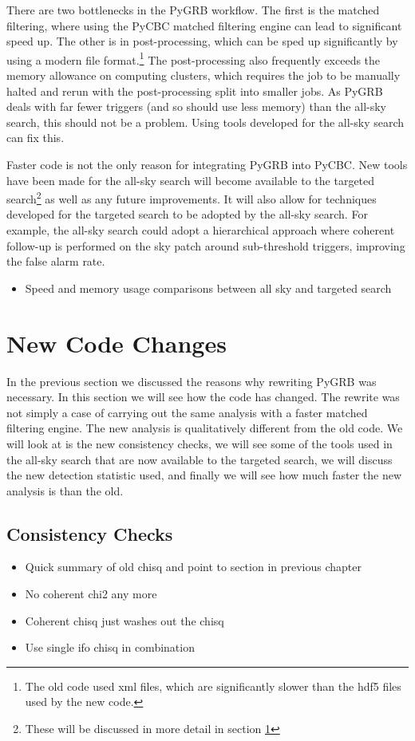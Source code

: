\documentclass[11pt]{cuthesis}
\begin{document}
There are two bottlenecks in the PyGRB workflow. The first is the matched filtering, where using the PyCBC matched filtering engine can lead to significant speed up. The other is in post-processing, which can be sped up significantly by using a modern file format.\footnote{The old code used xml files, which are significantly slower than the hdf5 files used by the new code.} The post-processing also frequently exceeds the memory allowance on computing clusters, which requires the job to be manually halted and rerun with the post-processing split into smaller jobs. As PyGRB deals with far fewer triggers (and so should use less memory) than the all-sky search, this should not be a problem. Using tools developed for the all-sky search can fix this. 

Faster code is not the only reason for integrating PyGRB into PyCBC. New tools have been made for the all-sky search will become available to the targeted search\footnote{These will be discussed in more detail in section \ref{sec:pygrb changes}} as well as any future improvements. It will also allow for techniques developed for the targeted search to be adopted by the all-sky search. For example, the all-sky search could adopt a hierarchical approach where coherent follow-up is performed on the sky patch around sub-threshold triggers, improving the false alarm rate.  

\begin{itemize}
\item Speed and memory usage comparisons between all sky and targeted search
\end{itemize}

\section{New Code Changes} \label{sec:pygrb changes}
In the previous section we discussed the reasons why rewriting PyGRB was necessary. In this section we will see how the code has changed. The rewrite was not simply a case of carrying out the same analysis with a faster matched filtering engine. The new analysis is qualitatively different from the old code. We will look at is the new consistency checks, we will see some of the tools used in the all-sky search that are now available to the targeted search, we will discuss the new detection statistic used, and finally we will see how much faster the new analysis is than the old. 

\subsection{Consistency Checks}
\begin{itemize}
\item Quick summary of old chisq and point to section in previous chapter
\item No coherent chi2 any more
\item Coherent chisq just washes out the chisq
\item Use single ifo chisq in combination 
\end{itemize}
\end{document}
